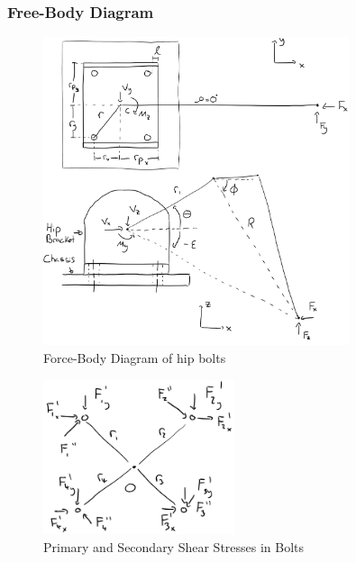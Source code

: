 \subsubsection{Free-Body Diagram}

\begin{figure}
    \centering
    \includegraphics[width=0.8\textwidth]{4_Analysis/img/Bolts/BoltsHipFBD.png}
    \caption{Force-Body Diagram of hip bolts}
    \label{fig:bolt_fbd_hip}
\end{figure}

\begin{figure}
    \centering
    \includegraphics[width=0.5\textwidth]{4_Analysis/img/Bolts/BoltsHipShearStress.png}
    \caption{Primary and Secondary Shear Stresses in Bolts}
    \label{fig:bolt_stress}
\end{figure}


